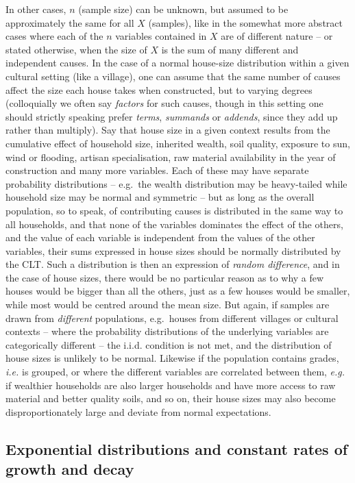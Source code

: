 \documentclass[
  12pt,
]{book}
\begin{document}
In other cases, \(n\) (sample size) can be unknown, but assumed to be approximately the same for all \(X\) (samples), like in the somewhat more abstract cases where each of the \(n\) variables contained in \(X\) are of different nature -- or stated otherwise, when the size of \(X\) is the sum of many different and independent causes. In the case of a normal house-size distribution within a given cultural setting (like a village), one can assume that the same number of causes affect the size each house takes when constructed, but to varying degrees (colloquially we often say \emph{factors} for such causes, though in this setting one should strictly speaking prefer \emph{terms}, \emph{summands} or \emph{addends}, since they add up rather than multiply). Say that house size in a given context results from the cumulative effect of household size, inherited wealth, soil quality, exposure to sun, wind or flooding, artisan specialisation, raw material availability in the year of construction and many more variables. Each of these may have separate probability distributions -- e.g.~the wealth distribution may be heavy-tailed while household size may be normal and symmetric -- but as long as the overall population, so to speak, of contributing causes is distributed in the same way to all households, and that none of the variables dominates the effect of the others, and the value of each variable is independent from the values of the other variables, their sums expressed in house sizes should be normally distributed by the CLT. Such a distribution is then an expression of \emph{random difference}, and in the case of house sizes, there would be no particular reason as to why a few houses would be bigger than all the others, just as a few houses would be smaller, while most would be centred around the mean size. But again, if samples are drawn from \emph{different} populations, e.g.~houses from different villages or cultural contexts -- where the probability distributions of the underlying variables are categorically different -- the i.i.d. condition is not met, and the distribution of house sizes is unlikely to be normal. Likewise if the population contains grades, \emph{i.e.} is grouped, or where the different variables are correlated between them, \emph{e.g.} if wealthier households are also larger households and have more access to raw material and better quality soils, and so on, their house sizes may also become disproportionately large and deviate from normal expectations.

\hypertarget{exponential-distributions-and-constant-rates-of-growth-and-decay}{%
\subsection{Exponential distributions and constant rates of growth and decay}\label{exponential-distributions-and-constant-rates-of-growth-and-decay}}
\end{document}
